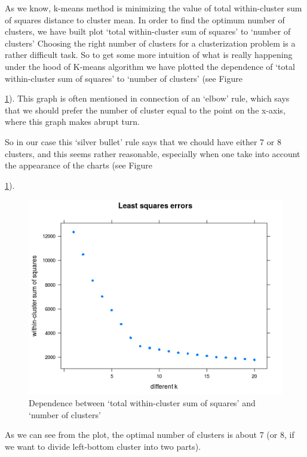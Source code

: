 As we know, k-means method is minimizing the value of total within-cluster sum of squares distance to cluster mean. 
In order to find the optimum number of clusters, we have built plot 
`total within-cluster sum of squares' to `number of clusters'  Choosing the right number of clusters for a clusterization problem is a rather difficult task. So to get some more intuition of what is really happening under the hood of K-means algorithm we have plotted the dependence of `total within-cluster sum of squares' to `number of clusters' (see Figure {\ref{fig:totalwithin-to-k}). This graph is often mentioned in connection of an `elbow' rule, which says that we should prefer the number of cluster equal to the  point on the x-axis, where this graph makes abrupt turn. 
	
So in our case this `silver bullet' rule says that we chould have either 7 or 8 clusters, and this seems rather  reasonable, especially when one take into account the appearance of the charts  (see Figure {\ref{fig:totalwithin-to-k}).
	
	\begin{figure}[h]
		\centering
		\begin{minipage}[h]{0.49\linewidth}
			\includegraphics[width=1.2\linewidth]{images/totalwithin}
		\end{minipage}
		\caption{Dependence between `total within-cluster sum of squares' and `number of clusters'}
		\label{fig:totalwithin-to-k}	
	\end{figure}
	
	As we can see from the plot, the optimal number of clusters is about 7 (or 8, if we want to divide left-bottom cluster into two parts).
	
}}
